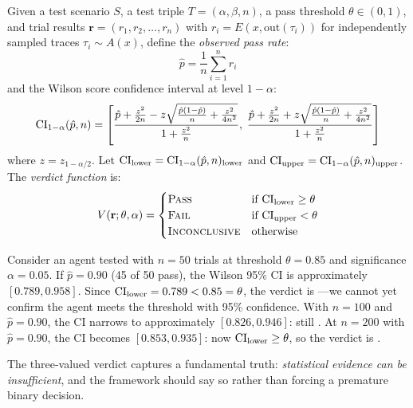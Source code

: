 \begin{definition}
\label{def:verdict}
Given a test scenario $S$, a test triple $T = (\alpha, \beta, n)$, a
pass threshold $\theta \in (0, 1)$, and trial results
$\mathbf{r} = (r_1, r_2, \ldots, r_n)$ with $r_i = E(x, \mathrm{out}(\tau_i))$
for independently sampled traces $\tau_i \sim A(x)$, define the
\emph{observed pass rate}:
\begin{equation}
\label{eq:passrate}
  \hat{p} = \frac{1}{n} \sum_{i=1}^{n} r_i
\end{equation}
and the Wilson score confidence interval at level $1-\alpha$:
\begin{equation}
\label{eq:wilson}
  \mathrm{CI}_{1-\alpha}(\hat{p}, n) = \left[
    \frac{\hat{p} + \frac{z^2}{2n} - z\sqrt{\frac{\hat{p}(1-\hat{p})}{n}
    + \frac{z^2}{4n^2}}}{1 + \frac{z^2}{n}},\;
    \frac{\hat{p} + \frac{z^2}{2n} + z\sqrt{\frac{\hat{p}(1-\hat{p})}{n}
    + \frac{z^2}{4n^2}}}{1 + \frac{z^2}{n}}
  \right]
\end{equation}
where $z = z_{1-\alpha/2}$. Let
$\mathrm{CI}_{\text{lower}} = \mathrm{CI}_{1-\alpha}(\hat{p}, n)_{\text{lower}}$ and
$\mathrm{CI}_{\text{upper}} = \mathrm{CI}_{1-\alpha}(\hat{p}, n)_{\text{upper}}$. The
\emph{verdict function} is:
\begin{equation}
\label{eq:verdict}
  V(\mathbf{r}; \theta, \alpha) =
  \begin{cases}
    \textsc{Pass} & \text{if } \mathrm{CI}_{\text{lower}} \geq \theta \\
    \textsc{Fail} & \text{if } \mathrm{CI}_{\text{upper}} < \theta \\
    \textsc{Inconclusive} & \text{otherwise}
  \end{cases}
\end{equation}
\end{definition}

\begin{example}
\label{ex:verdict}
Consider an agent tested with $n = 50$ trials at threshold
$\theta = 0.85$ and significance $\alpha = 0.05$. If $\hat{p} = 0.90$
(45 of 50 pass), the Wilson 95\% CI is approximately $[0.789, 0.958]$.
Since $\mathrm{CI}_{\text{lower}} = 0.789 < 0.85 = \theta$, the verdict is
\INCONC{}---we cannot yet confirm the agent meets the threshold with 95\%
confidence. With $n = 100$ and $\hat{p} = 0.90$, the CI narrows to
approximately $[0.826, 0.946]$: still \INCONC{}. At $n = 200$ with
$\hat{p} = 0.90$, the CI becomes $[0.853, 0.935]$: now
$\mathrm{CI}_{\text{lower}} \geq \theta$, so the verdict is \PASS{}.
\end{example}

The three-valued verdict captures a fundamental truth: \emph{statistical
evidence can be insufficient}, and the framework should say so rather
than forcing a premature binary decision.

